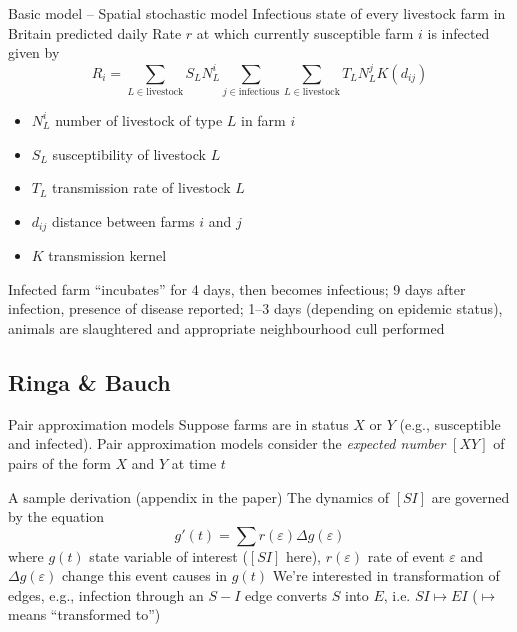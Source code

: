 \documentclass[aspectratio=43]{beamer}
\begin{document}

\begin{frame}{Basic model -- Spatial stochastic model}
	Infectious state of every livestock farm in Britain predicted daily 
	\vfill
	Rate $r$ at which currently susceptible farm $i$ is infected given by
	\[
		R_i = \sum_{L\in\text{livestock}}S_LN_L^i
		\sum_{j\in\text{infectious}}\sum_{L\in\text{livestock}} T_LN_L^jK(d_{ij})
	\]
	\begin{itemize}
		\item $N_L^i$ number of livestock of type $L$ in farm $i$
		\item $S_L$ susceptibility of livestock $L$
		\item $T_L$ transmission rate of livestock $L$
		\item $d_{ij}$ distance between farms $i$ and $j$
		\item $K$ transmission kernel
	\end{itemize}
	\vfill
	Infected farm ``incubates'' for 4 days, then becomes infectious; 9 days after infection, presence of disease reported; 1--3 days (depending on epidemic status), animals are slaughtered and appropriate neighbourhood cull performed
\end{frame}


\subsection{Ringa \& Bauch}

\begin{frame}{Pair approximation models}
	Suppose farms are in status $X$ or $Y$ (e.g., susceptible and infected).
	Pair approximation models consider the \emph{expected number} $[XY]$ of pairs of the form $X$ and $Y$ at time $t$
\end{frame}

\begin{frame}{A sample derivation (appendix in the paper)}
	The dynamics of $[SI]$ are governed by the equation
	\[
		g'(t)=\sum r(\varepsilon)\Delta g(\varepsilon)
	\]
	where $g(t)$ state variable of interest ($[SI]$ here), $r(\varepsilon)$ rate of event $\varepsilon$ and $\Delta g(\varepsilon)$ change this event causes in $g(t)$
	\vfill
	We're interested in transformation of edges, e.g., infection through an $S-I$ edge converts $S$ into $E$, i.e. $SI\mapsto EI$ ($\mapsto$ means ``transformed to'')
\end{frame}
	
\end{document}
